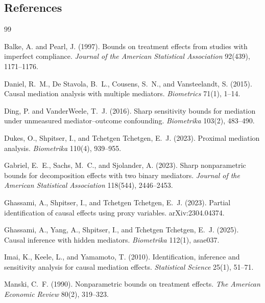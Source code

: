 \documentclass[11pt]{article}
\theoremstyle{definition}
\theoremstyle{plain}
\theoremstyle{remark}
\begin{document}
\subsection*{References}
\begin{thebibliography}{99}

Balke, A. and Pearl, J. (1997).
\newblock Bounds on treatment effects from studies with imperfect compliance.
\newblock \emph{Journal of the American Statistical Association} 92(439),
1171--1176.

Daniel, R.~M., De Stavola, B.~L., Cousens, S.~N., and Vansteelandt, S. (2015).
\newblock Causal mediation analysis with multiple mediators.
\newblock \emph{Biometrics} 71(1), 1--14.

Ding, P. and VanderWeele, T.~J. (2016).
\newblock Sharp sensitivity bounds for mediation under unmeasured
mediator--outcome confounding.
\newblock \emph{Biometrika} 103(2), 483--490.

Dukes, O., Shpitser, I., and Tchetgen Tchetgen, E.~J. (2023).
\newblock Proximal mediation analysis.
\newblock \emph{Biometrika} 110(4), 939--955.

Gabriel, E.~E., Sachs, M.~C., and Sjolander, A. (2023).
\newblock Sharp nonparametric bounds for decomposition effects with two binary
mediators.
\newblock \emph{Journal of the American Statistical Association} 118(544),
2446--2453.

Ghassami, A., Shpitser, I., and Tchetgen Tchetgen, E.~J. (2023).
\newblock Partial identification of causal effects using proxy variables.
\newblock arXiv:2304.04374.

Ghassami, A., Yang, A., Shpitser, I., and Tchetgen Tchetgen, E.~J. (2025).
\newblock Causal inference with hidden mediators.
\newblock \emph{Biometrika} 112(1), asae037.

Imai, K., Keele, L., and Yamamoto, T. (2010).
\newblock Identification, inference and sensitivity analysis for causal
mediation effects.
\newblock \emph{Statistical Science} 25(1), 51--71.

Manski, C.~F. (1990).
\newblock Nonparametric bounds on treatment effects.
\newblock \emph{The American Economic Review} 80(2), 319--323.


\end{thebibliography}
\end{document}
